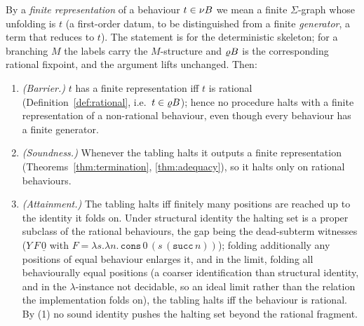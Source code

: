 \begin{theorem}\label{thm:optimal}
  By a \emph{finite representation} of a behaviour $t \in \nu B$ we mean a finite $\Sigma$-graph whose
  unfolding is $t$ (a first-order datum, to be distinguished from a finite \emph{generator}, a term that
  reduces to $t$). The statement is for the deterministic skeleton; for a branching $M$ the labels carry
  the $M$-structure and $\varrho B$ is the corresponding rational fixpoint, and the argument lifts
  unchanged. Then:
  \begin{enumerate}
    \item \emph{(Barrier.)} $t$ has a finite representation iff $t$ is rational (Definition~\ref{def:rational},
      i.e.\ $t \in \varrho B$); hence no procedure halts with a finite representation of a non-rational
      behaviour, even though every behaviour has a finite generator.
    \item \emph{(Soundness.)} Whenever the tabling halts it outputs a finite representation
      (Theorems~\ref{thm:termination}, \ref{thm:adequacy}), so it halts only on rational behaviours.
    \item \emph{(Attainment.)} The tabling halts iff finitely many positions are reached up to the identity
      it folds on. Under structural identity the halting set is a proper subclass of the rational
      behaviours, the gap being the dead-subterm witnesses ($Y\,F\,\underline{0}$ with
      $F=\lambda s.\lambda n.\,\mathtt{cons}\,0\,(s\,(\mathtt{succ}\,n))$); folding additionally any
      positions of equal behaviour enlarges it, and in the limit, folding all behaviourally equal
      positions (a coarser identification than structural identity, and in the $\lambda$-instance not
      decidable, so an ideal limit rather than the relation the implementation folds on), the tabling
      halts iff the behaviour is rational. By (1) no sound identity pushes the halting set beyond the
      rational fragment.
  \end{enumerate}
\end{theorem}
